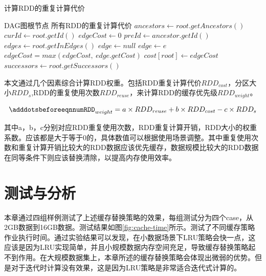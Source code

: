 \begin{algorithm}  
    \caption{计算RDD的重复计算代价}  
    \begin{algorithmic}[1] %
        \Require DAG图根节点
        \Ensure 所有RDD的重复计算代价
            \State $ancestors \gets root.getAncestors()$
            \State $curId \gets root.getId()$
            \State $edgeCost \gets 0$
                \State $preId \gets ancestor.getId()$
                \State $edges \gets root.getInEdges()$
                \State $edge \gets null$
                        \State $edge \gets e$
                    \EndIf
                \EndFor
                \State $edgeCost = max(edgeCost, \ edge.getCost)$
            \EndFor
            \State $cost[root] \gets edgeCost$
            \State $successors \gets root.getSuccessors()$
                \State {}
            \EndFor
        \EndFunction
    \end{algorithmic}
    \label{alg:rdd-cost}
\end{algorithm}

本文通过几个因素综合计算RDD权重。包括RDD重复计算代价$RDD_{cost}$，分区大小$RDD_s$,RDD的重复使用次数$RDD_{reuse}$，来计算RDD的缓存优先级$RDD_{weight}$。

\begin{equation} \label{eq:weight}
    \adddotsbeforeeqnnum%
    RDD_{weight}=a \times RDD_{reuse} + b \times RDD_{cost} - c \times RDD_{s}
\end{equation}

其中a，b，c分别对应RDD重复使用次数，RDD重复计算开销，RDD大小的权重系数。应该都是大于等于0的，具体数值可以根据使用场景调整。其中重复使用次数和重复计算开销比较大的RDD数据应该优先缓存，数据规模比较大的RDD数据在同等条件下则应该替换清除，以提高内存使用效率。

\section{测试与分析}

本章通过四组样例测试了上述缓存替换策略的效果，每组测试分为四个case，从2GB数据到16GB数据。测试结果如图\ref{fig:cache-time}所示。测试了不同缓存策略作业执行时间。通过实验结果可以发现，在小数据场景下LRU策略会快一点，这应该是因为LRU实现简单，并且小规模数据内存空间充足，导致缓存替换策略起不到作用。在大规模数据集上，本章所述的缓存替换策略会体现出微弱的优势。但是对于迭代时计算没有效果，这是因为LRU策略是非常适合迭代式计算的。

